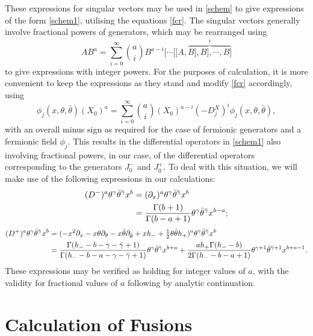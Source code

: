 \documentclass[a4paper,12pt]{article}
\def\thetabar    {\bar{\theta}}
\def\hf          {\tfrac{1}{2}}
\begin{document}
These expressions for singular vectors may be used in \eqref{schem} to give
expressions of the form \eqref{schem1}, utilising the equations  \eqref{fcr}.
The singular vectors generally involve fractional powers of generators, which
may be rearranged using 
\begin{equation}
\label{rear}
AB^a=\sum_{i=0}^{\infty}\binom{a}{i}B^{a-i}[\cdots[[A,\overbrace{B],B],\cdots,B]}^{i}
\end{equation}
to give expressions with integer powers.  For the purposes of calculation, it
is more convenient to keep the expressions as they stand and modify
\eqref{fcr} accordingly, using 
\begin{equation}
\label{fdcr}
\phi_j(x,\theta,\thetabar)(X_0)^a=\sum_{i=0}^{\infty}\binom{a}{i}(X_0)^{a-i}(-D^X_j)^i\phi_j(x,\theta,\thetabar),
\end{equation}
with an overall minus sign as required for the case of fermionic generators
and a fermionic field $\phi_j$.  This results in the differential operators
in \eqref{schem1} also involving fractional powers, in our case, of the
differential operators corresponding to the generators $J_0^-$ and $J_0^+$.
To deal with this situation, we will make use of the following expressions in
our calculations:
\begin{align}
(D^-)^{a}\theta^{\gamma}\thetabar^{\bar{\gamma}}x^b &=
(\partial_x)^{a}\theta^{\gamma}\thetabar^{\bar{\gamma}}x^b\notag\\ 
&= \frac{\Gamma(b+1)}{\Gamma(b-a+1)}\theta^{\gamma}
\thetabar^{\bar{\gamma}}x^{b-a};
\end{align}
\begin{align}
(D^+)^{a}\theta^{\gamma}\thetabar^{\bar{\gamma}}x^b &=
(-x^2\partial_x - x\theta\partial_{\theta} -x\thetabar\partial_{\thetabar} 
+xh_- +\hf \theta\thetabar h_+)^{a}\theta^{\gamma}\thetabar^{\bar{\gamma}}x^b \notag\\
&= \frac{\Gamma(h_- -b- \gamma-\bar{\gamma}+1)}{\Gamma(h_- -b-a- \gamma-\bar{\gamma}+1)}\theta^{\gamma}\thetabar^{\bar{\gamma}}x^{b+a} 
+\frac{ah_+\Gamma(h_- -b)}{2\Gamma(h_- -b-a+1)}\theta^{\gamma+1}\thetabar^{\bar{\gamma}+1}x^{b+a-1}.
\end{align}
These expressions may be verified as holding for integer values of $a$, with
the validity for fractional values of $a$ following by analytic continuation.


\section{Calculation of Fusions}
\end{document}
